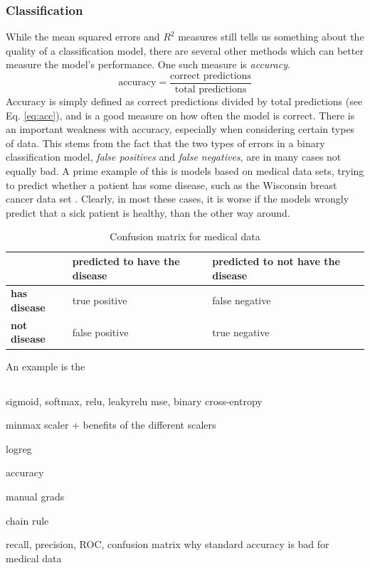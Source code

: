 \subsubsection{Classification}
While the mean squared errors and $R^2$ measures still tells us something about the quality of a classification model, there are several other methods which can better measure the model's performance.
One such measure is \textit{accuracy}.
\begin{equation}\label{eq:acc}
    \text{accuracy} = \frac{\text{correct predictions}}{\text{total predictions}}
\end{equation}
Accuracy is simply defined as correct predictions divided by total predictions (see Eq. \ref{eq:acc}), and is a good measure on how often the model is correct.
There is an important weakness with accuracy, especially when considering certain types of data.
This stems from the fact that the two types of errors in a binary classification model, \textit{false positives} and \textit{false negatives}, are in many cases not equally bad.
A prime example of this is models based on medical data sets, trying to predict whether a patient has some disease, such as the Wisconsin breast cancer data set \cite{breast_cancer_wisconsin}.
Clearly, in most these cases, it is worse if the models wrongly predict that a sick patient is healthy, than the other way around.
\begin{table}[h]
    \centering
    \begin{tabular}{|m{8em}|m{8em}|m{8em}|}
    \hline
         & \textbf{predicted to have the disease} & \textbf{predicted to not have the disease} \\
         \hline
         \textbf{has disease} & true positive & false negative \\
         \hline
         \textbf{not disease} & false positive & true negative\\
    \hline
    \end{tabular}
    \caption{Confusion matrix for medical data}
    \label{tab:my_label}
\end{table}
An example is the 

\subsection{}

sigmoid, softmax, relu, leakyrelu
mse, binary cross-entropy 


minmax scaler + benefits of the different scalers 

logreg 

accuracy

manual grads

chain rule 


recall, precision, ROC, confusion matrix 
    why standard accuracy is bad for medical data
